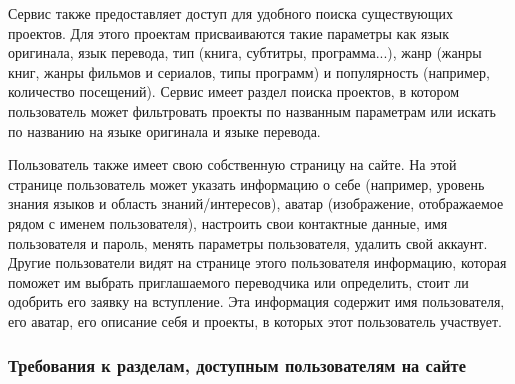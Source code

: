 \documentclass[a4paper,12pt]{article}
\begin{document}
Сервис также предоставляет доступ для удобного поиска существующих проектов. Для этого проектам присваиваются такие параметры как язык оригинала, язык перевода, тип (книга, субтитры, программа...), жанр (жанры книг, жанры фильмов и сериалов, типы программ) и популярность (например, количество посещений). Сервис имеет раздел поиска проектов, в котором пользователь может фильтровать проекты по названным параметрам или искать по названию на языке оригинала и языке перевода.

Пользователь также имеет свою собственную страницу на сайте. На этой странице пользователь может указать информацию о себе (например, уровень знания языков и область знаний/интересов), аватар (изображение, отображаемое рядом с именем пользователя), настроить свои контактные данные, имя пользователя и пароль, менять параметры пользователя, удалить свой аккаунт. Другие пользователи видят на странице этого пользователя информацию, которая поможет им выбрать приглашаемого переводчика или определить, стоит ли одобрить его заявку на вступление. Эта информация содержит имя пользователя, его аватар, его описание себя и проекты, в которых этот пользователь участвует.

\subsubsection{Требования к разделам, доступным пользователям на сайте}
\end{document}
